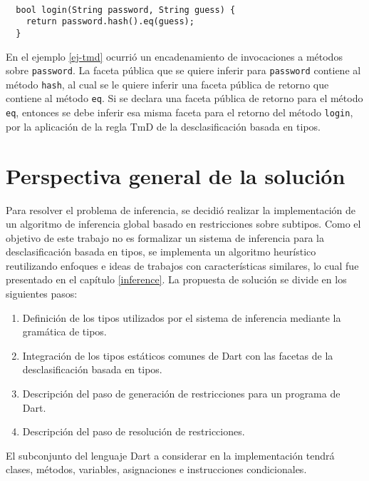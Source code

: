 \begin{ej} \ \\
  \label{ej-tmd}
  \normalfont
\begin{lstlisting}
  bool login(String password, String guess) {
    return password.hash().eq(guess);
  }
\end{lstlisting}
\end{ej}

En el ejemplo \ref{ej-tmd} ocurrió un encadenamiento de invocaciones a métodos sobre \texttt{password}. La faceta pública que se quiere inferir para \texttt{password} contiene al método \texttt{hash}, al cual se le quiere inferir una faceta pública de retorno que contiene al método \texttt{eq}. Si se declara una faceta pública de retorno para el método \texttt{eq}, entonces se debe inferir esa misma faceta para el retorno del método \texttt{login}, por la aplicación de la regla $\text{TmD}$ de la desclasificación basada en tipos.

\section{Perspectiva general de la solución} \label{diseno}
Para resolver el problema de inferencia, se decidió realizar la implementación de un algoritmo de inferencia global basado en restricciones sobre subtipos. Como el objetivo de este trabajo no es formalizar un sistema de inferencia para la desclasificación basada en tipos, se implementa un algoritmo heurístico reutilizando enfoques e ideas de trabajos con características similares, lo cual fue presentado en el capítulo \ref{inference}. La propuesta de solución se divide en los siguientes pasos:

\begin{enumerate}
  \item Definición de los tipos utilizados por el sistema de inferencia mediante la gramática de tipos.
  \item Integración de los tipos estáticos comunes de Dart con las facetas de la desclasificación basada en tipos.
  \item Descripción del paso de generación de restricciones para un programa de Dart.
  \item Descripción del paso de resolución de restricciones.
\end{enumerate}

El subconjunto del lenguaje Dart a considerar en la implementación tendrá clases, métodos, variables, asignaciones e instrucciones condicionales.


